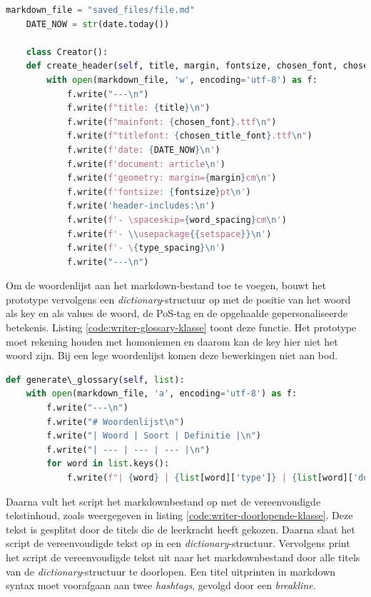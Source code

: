 \begin{lstlisting}[language=Python, caption={Writer-klasse omvattende de code om dynamische PDF- en Word-documenten te genereren.}, label={code:yaml-header-function}]
	markdown_file = "saved_files/file.md"
	DATE_NOW = str(date.today())
	
	class Creator():
	def create_header(self, title, margin, fontsize, chosen_font, chosen_title_font, word_spacing, type_spacing):
		with open(markdown_file, 'w', encoding='utf-8') as f:
			f.write("---\n")
			f.write(f"title: {title}\n") 
			f.write(f"mainfont: {chosen_font}.ttf\n")
			f.write(f"titlefont: {chosen_title_font}.ttf\n")
			f.write(f'date: {DATE_NOW}\n')
			f.write(f'document: article\n')
			f.write(f'geometry: margin={margin}cm\n')
			f.write(f'fontsize: {fontsize}pt\n')
			f.write('header-includes:\n')
			f.write(f'- \spaceskip={word_spacing}cm\n')
			f.write(f'- \\usepackage{{setspace}}\n')
			f.write(f'- \{type_spacing}\n')
			f.write("---\n")
\end{lstlisting}

Om de woordenlijst aan het markdown-bestand toe te voegen, bouwt het prototype vervolgens een \textit{dictionary}-structuur op met de positie van het woord als key en als values de woord, de PoS-tag en de opgehaalde gepersonaliseerde betekenis. Listing \ref{code:writer-glossary-klasse} toont deze functie. Het prototype moet rekening houden met homoniemen en daarom kan de key hier niet het woord zijn. Bij een lege woordenlijst komen deze bewerkingen niet aan bod. 

\begin{lstlisting}[language=Python, caption={Een woordenlijst genereren met de Writer-klasse.}, label={code:writer-glossary-klasse}]
def generate\_glossary(self, list):
	with open(markdown_file, 'a', encoding='utf-8') as f:
		f.write("---\n")
		f.write("# Woordenlijst\n")
		f.write("| Woord | Soort | Definitie |\n")
		f.write("| --- | --- | --- |\n")
		for word in list.keys(): 
			f.write(f"| {word} | {list[word]['type']} | {list[word]['definition']} |\n")
\end{lstlisting}

Daarna vult het script het markdownbestand op met de vereenvoudigde tekstinhoud, zoals weergegeven in listing \ref{code:writer-doorlopende-klasse}. Deze tekst is gesplitst door de titels die de leerkracht heeft gekozen. Daarna slaat het script de vereenvoudigde tekst op in een \textit{dictionary}-structuur. Vervolgens print het script de vereenvoudigde tekst uit naar het markdownbestand door alle titels van de \textit{dictionary}-structuur te doorlopen. Een titel uitprinten in markdown syntax moet voorafgaan aan twee \textit{hashtags}, gevolgd door een \textit{breakline}.

